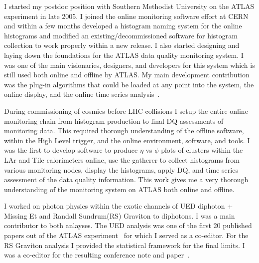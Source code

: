 I started my postdoc position with Southern Methodist University on the ATLAS experiment in late 2005.  I joined the online monitoring software effort at CERN and within a few months developed a histogram
naming system for the online histograms and modified an existing/decommissioned software for histogram collection to work properly within a new release.  
I also started designing and laying down the foundations for the ATLAS data quality monitoring system.  I was one of the main visionaries, designers, and developers for this system
which is still used both online and offline by ATLAS. My main development contribution was the plug-in algorithms that could be loaded at any point into the system, the online display, and the online time series analysis~\cite{atl5b,atl6}.

During commissioning of cosmics before LHC collisions I setup the entire online monitoring chain from histogram production to final DQ assessments of monitoring data.  This required thorough understanding
of the offline software, within the High Level trigger, and the online environment, software, and tools.  I was the first to develop software to produce $\eta$ vs $\phi$ plots of clusters within the LAr and Tile calorimeters online, use the gatherer to
collect histograms from various monitoring nodes, display the histograms, apply DQ, and time series assessment of the data quality information.  This work gives me a very thorough understanding of the monitoring system on ATLAS both online and offline.

I worked on photon physics within the exotic channels of UED diphoton + Missing Et and Randall Sundrum(RS) Graviton to diphotons. I was a main contributor to both anlayses.  The UED analysis was one of the first 20 published papers
out of the ATLAS experiment~\cite{atl2} for which I served as a co-editor. For the RS Graviton analysis I provided the statistical framework for the final limits. I was a co-editor for the resulting conference note and paper~\cite{atl1}.

